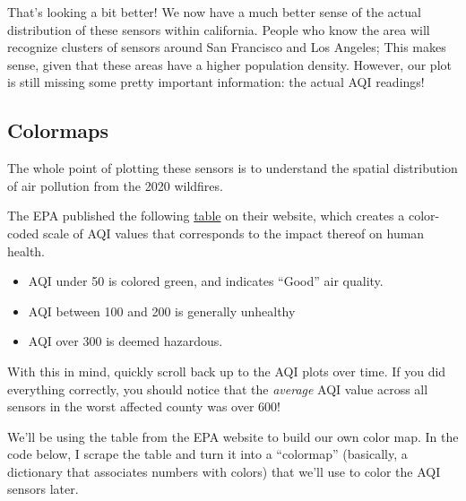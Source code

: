\documentclass[
  letterpaper,
  DIV=11,
  numbers=noendperiod]{scrreprt}
\providecommand{\tightlist}{%
  \setlength{\itemsep}{0pt}\setlength{\parskip}{0pt}}\usepackage{longtable,booktabs,array}
\begin{document}
That's looking a bit better! We now have a much better sense of the
actual distribution of these sensors within california. People who know
the area will recognize clusters of sensors around San Francisco and Los
Angeles; This makes sense, given that these areas have a higher
population density. However, our plot is still missing some pretty
important information: the actual AQI readings!

\hypertarget{colormaps}{%
\subsection{Colormaps}\label{colormaps}}

The whole point of plotting these sensors is to understand the spatial
distribution of air pollution from the 2020 wildfires.

The EPA published the following
\href{https://www.airnow.gov/aqi/aqi-basics/}{table} on their website,
which creates a color-coded scale of AQI values that corresponds to the
impact thereof on human health.

\begin{itemize}
\tightlist
\item
  AQI under 50 is colored green, and indicates ``Good'' air quality.
\item
  AQI between 100 and 200 is generally unhealthy
\item
  AQI over 300 is deemed hazardous.
\end{itemize}

With this in mind, quickly scroll back up to the AQI plots over time. If
you did everything correctly, you should notice that the \emph{average}
AQI value across all sensors in the worst affected county was over 600!

We'll be using the table from the EPA website to build our own color
map. In the code below, I scrape the table and turn it into a
``colormap'' (basically, a dictionary that associates numbers with
colors) that we'll use to color the AQI sensors later.
\end{document}
